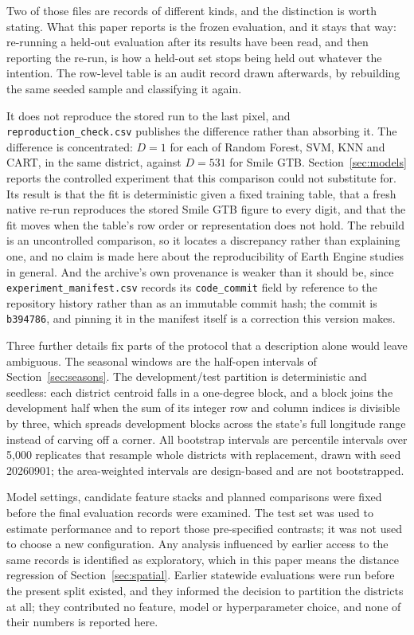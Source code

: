 \documentclass[conference]{IEEEtran}
\begin{document}
Two of those files are records of different kinds, and the distinction is worth stating. What this paper reports is the frozen evaluation, and it stays that way: re-running a held-out evaluation after its results have been read, and then reporting the re-run, is how a held-out set stops being held out whatever the intention. The row-level table is an audit record drawn afterwards, by rebuilding the same seeded sample and classifying it again.

It does not reproduce the stored run to the last pixel, and \texttt{reproduction\_check.csv} publishes the difference rather than absorbing it. The difference is concentrated: $D=1$ for each of Random Forest, SVM, KNN and CART, in the same district, against $D=531$ for Smile GTB. Section~\ref{sec:models} reports the controlled experiment that this comparison could not substitute for. Its result is that the fit is deterministic given a fixed training table, that a fresh native re-run reproduces the stored Smile GTB figure to every digit, and that the fit moves when the table's row order or representation does not hold. The rebuild is an uncontrolled comparison, so it locates a discrepancy rather than explaining one, and no claim is made here about the reproducibility of Earth Engine studies in general. And the archive's own provenance is weaker than it should be, since \texttt{experiment\_manifest.csv} records its \texttt{code\_commit} field by reference to the repository history rather than as an immutable commit hash; the commit is \texttt{b394786}, and pinning it in the manifest itself is a correction this version makes.

Three further details fix parts of the protocol that a description alone would leave ambiguous. The seasonal windows are the half-open intervals of Section~\ref{sec:seasons}. The development/test partition is deterministic and seedless: each district centroid falls in a one-degree block, and a block joins the development half when the sum of its integer row and column indices is divisible by three, which spreads development blocks across the state's full longitude range instead of carving off a corner. All bootstrap intervals are percentile intervals over 5{,}000 replicates that resample whole districts with replacement, drawn with seed 20260901; the area-weighted intervals are design-based and are not bootstrapped.

Model settings, candidate feature stacks and planned comparisons were fixed before the final evaluation records were examined. The test set was used to estimate performance and to report those pre-specified contrasts; it was not used to choose a new configuration. Any analysis influenced by earlier access to the same records is identified as exploratory, which in this paper means the distance regression of Section~\ref{sec:spatial}. Earlier statewide evaluations were run before the present split existed, and they informed the decision to partition the districts at all; they contributed no feature, model or hyperparameter choice, and none of their numbers is reported here.
\end{document}
